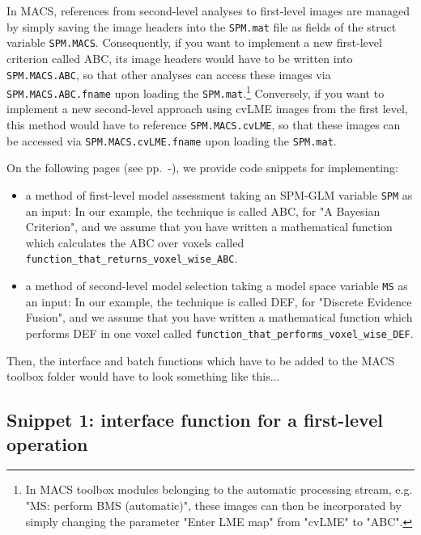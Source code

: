 \documentclass[a4paper,12pt]{article}
\begin{document}
In MACS, references from second-level analyses to first-level images are managed by simply saving the image headers into the \texttt{SPM.mat} file as fields of the struct variable \texttt{SPM.MACS}. Consequently, if you want to implement a new first-level criterion called ABC, its image headers would have to be written into \texttt{SPM.MACS.ABC}, so that other analyses can access these images via \texttt{SPM.MACS.ABC.fname} upon loading the \texttt{SPM.mat}.\footnote{In MACS toolbox modules belonging to the automatic processing stream, e.g. "MS: perform BMS (automatic)", these images can then be incorporated by simply changing the parameter "Enter LME map" from "cvLME" to "ABC".} Conversely, if you want to implement a new second-level approach using cvLME images from the first level, this method would have to reference \texttt{SPM.MACS.cvLME}, so that these images can be accessed via \texttt{SPM.MACS.cvLME.fname} upon loading the \texttt{SPM.mat}.

On the following pages (see pp.~\pageref{sec:ABC-inter}-\pageref{sec:DEF-batch}), we provide code snippets for implementing:

\begin{itemize}
	
\item
a method of first-level model assessment taking an SPM-GLM variable \texttt{SPM} as an input: In our example, the technique is called ABC, for "A Bayesian Criterion", and we assume that you have written a mathematical function which calculates the ABC over voxels called \texttt{function\_that\_returns\_voxel\_wise\_ABC}.
	
\item
a method of second-level model selection taking a model space variable \texttt{MS} as an input: In our example, the technique is called DEF, for "Discrete Evidence Fusion", and we assume that you have written a mathematical function which performs DEF in one voxel called \texttt{function\_that\_performs\_voxel\_wise\_DEF}.

\end{itemize}

Then, the interface and batch functions which have to be added to the MACS toolbox folder would have to look something like this...


\pagebreak
\subsection*{Snippet 1: interface function for a first-level operation} \label{sec:ABC-inter}
\end{document}
